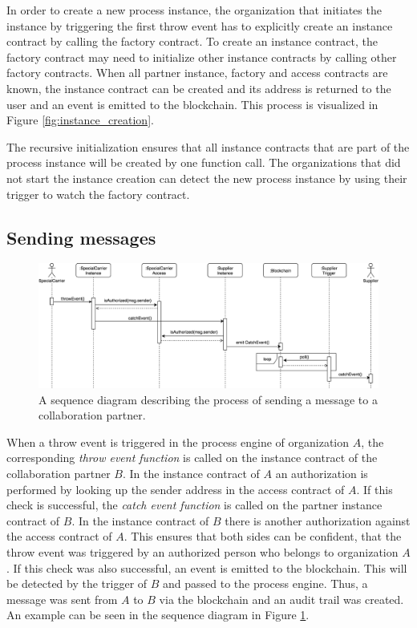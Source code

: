 \documentclass[runningheads]{llncs}
\begin{document}
In order to create a new process instance, the organization that initiates the instance by triggering the first throw event has to explicitly create an instance contract by calling the factory contract.
To create an instance contract, the factory contract may need to initialize other instance contracts by calling other factory contracts.
When all partner instance, factory and access contracts are known, the instance contract can be created and its address is returned to the user and an event is emitted to the blockchain.
This process is visualized in Figure \ref{fig:instance_creation}.

The recursive initialization ensures that all instance contracts that are part of the process instance will be created by one function call.
The organizations that did not start the instance creation can detect the new process instance by using their trigger to watch the factory contract.

\subsection{Sending messages}
\begin{figure}
	\centering
	\includegraphics[width=\textwidth]{fig/event_sending.eps}
	\caption{A sequence diagram describing the process of sending a message to a collaboration partner.} 
	\label{fig:event_sending}
\end{figure}

When a throw event is triggered in the process engine of organization $A$, the corresponding \emph{throw event function} is called on the instance contract of the collaboration partner $B$.
In the instance contract of $A$ an authorization is performed by looking up the sender address in the access contract of $A$.
If this check is successful, the \emph{catch event function} is called on the partner instance contract of $B$.
In the instance contract of $B$ there is another authorization against the access contract of $A$.
This ensures that both sides can be confident, that the throw event was triggered by an authorized person who belongs to organization $A$.
If this check was also successful, an event is emitted to the blockchain.
This will be detected by the trigger of $B$ and passed to the process engine.
Thus, a message was sent from $A$ to $B$ via the blockchain and an audit trail was created.
An example can be seen in the sequence diagram in Figure \ref{fig:event_sending}.
\end{document}
